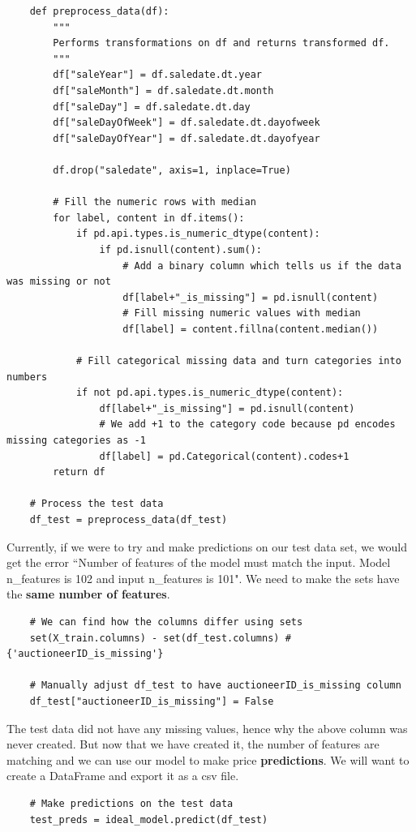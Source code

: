 \documentclass[11pt, a4paper]{article}
\begin{document}
\begin{spacing}{1.1}
\begin{lstlisting}
	def preprocess_data(df):
		"""
		Performs transformations on df and returns transformed df.
		"""
		df["saleYear"] = df.saledate.dt.year
		df["saleMonth"] = df.saledate.dt.month
		df["saleDay"] = df.saledate.dt.day
		df["saleDayOfWeek"] = df.saledate.dt.dayofweek
		df["saleDayOfYear"] = df.saledate.dt.dayofyear
		
		df.drop("saledate", axis=1, inplace=True)
		
		# Fill the numeric rows with median
		for label, content in df.items():
			if pd.api.types.is_numeric_dtype(content):
				if pd.isnull(content).sum():
					# Add a binary column which tells us if the data was missing or not
					df[label+"_is_missing"] = pd.isnull(content)
					# Fill missing numeric values with median
					df[label] = content.fillna(content.median())
			
			# Fill categorical missing data and turn categories into numbers
			if not pd.api.types.is_numeric_dtype(content):
				df[label+"_is_missing"] = pd.isnull(content)
				# We add +1 to the category code because pd encodes missing categories as -1
				df[label] = pd.Categorical(content).codes+1
		return df 
	
	# Process the test data 
	df_test = preprocess_data(df_test) \end{lstlisting} \newpage

	\noindent Currently, if we were to try and make predictions on our test data set, we would get the error ``Number of features of the model must match the input. Model n\_features is 102 and input n\_features is 101". We need to make the sets have the \textbf{same number of features}. 
	\begin{lstlisting}
	# We can find how the columns differ using sets
	set(X_train.columns) - set(df_test.columns) # {'auctioneerID_is_missing'}
	
	# Manually adjust df_test to have auctioneerID_is_missing column
	df_test["auctioneerID_is_missing"] = False \end{lstlisting} \vspace*{1mm}
	The test data did not have any missing values, hence why the above column was never created. But now that we have created it, the number of features are matching and we can use our model to make price \textbf{predictions}. We will want to create a DataFrame and export it as a csv file.
	\begin{lstlisting}
	# Make predictions on the test data
	test_preds = ideal_model.predict(df_test)
	

\end{lstlisting}
\end{spacing}
\end{document}
